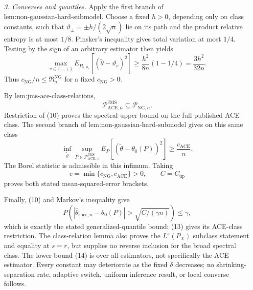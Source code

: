\emph{3. Converses and quantiles.}
Apply the first branch of \(\text{lem:non-gaussian-hard-submodel}\).  Choose
a fixed \(h>0\), depending only on class constants, such that
\(\vartheta_{\pm}=\pm h/(2\sqrt n)\) lie on its path and the product
relative entropy is at most \(1/8\).  Pinsker's inequality gives total
variation at most \(1/4\).  Testing by the sign of an arbitrary estimator
then yields
\[
 \max_{v\in\{-,+\}}
 E_{P_{n,\vartheta_v}}[(\widetilde\theta-\vartheta_v)^2]
 \ge\frac{h^2}{8n}(1-1/4)
 =\frac{3h^2}{32n}.                                               \tag{12}
\]
Thus \(c_{\mathrm{NG}}/n\le\mathfrak R_n^{\mathrm{NG}}\) for a fixed
\(c_{\mathrm{NG}}>0\).

By \(\text{lem:jms-ace-class-relations}\),
\[
 \mathcal P_{\mathrm{ACE},n}^{\mathrm{JMS}}
 \subseteq\mathcal P_{\mathrm{NG},n}.                            \tag{13}
\]
Restriction of (10) proves the spectral upper bound on the full published
ACE class.  The second branch of
\(\text{lem:non-gaussian-hard-submodel}\) gives on this same class
\[
 \inf_{\widetilde\theta}
 \sup_{P\in\mathcal P_{\mathrm{ACE},n}^{\mathrm{JMS}}}
 E_P[(\widetilde\theta-\theta_0(P))^2]
 \ge\frac{c_{\mathrm{ACE}}}{n}.                                  \tag{14}
\]
The Borel statistic is admissible in this infimum.  Taking
\[
 c=\min\{c_{\mathrm{NG}},c_{\mathrm{ACE}}\}>0,
 \qquad C=C_{\mathrm{up}}
\]
proves both stated mean-squared-error brackets.

Finally, (10) and Markov's inequality give
\[
 P\!\left(
 |\widehat\theta_{\mathrm{spec},n}-\theta_0(P)|
 >\sqrt{C/(\gamma n)}
 \right)\le\gamma,
\]
which is exactly the stated generalized-quantile bound; (13) gives its
ACE-class restriction.  The class-relation lemma also proves the
\(L^s(P_X)\) subclass statement and equality at \(s=r\), but supplies no
reverse inclusion for the broad spectral class.  The lower bound (14) is
over all estimators, not specifically the ACE estimator.  Every constant may
deteriorate as the fixed \(\delta\) decreases; no shrinking-separation rate,
adaptive switch, uniform inference result, or local converse follows.